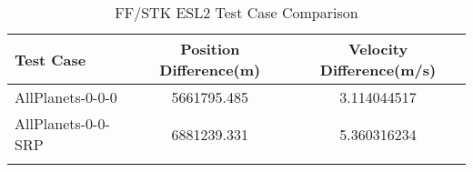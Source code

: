 \begin{table}[htbp!]
\centering
\caption{ FF/STK ESL2 Test Case Comparison}
      \begin{tabular}{lcc}
      \hline\hline
          Test Case & Position Difference(m) & Velocity Difference(m/s) \\
         \hline
         AllPlanets-0-0-0 & 5661795.485 & 3.114044517 \\
         AllPlanets-0-0-SRP & 6881239.331 & 5.360316234 \\
      \hline\hline
      \label{Table: ESL2 FF-STK Table} 
\end{tabular}
\end{table}
